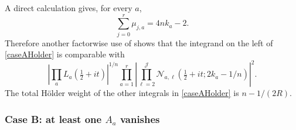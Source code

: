 \documentclass[oneside, 12pt]{amsart}
\theoremstyle{definition}
\begin{document}
{		A direct calculation gives, for every $a$,
		\begin{equation}\label{caseAMuSum}
			\sum_{j=0}^r\mu_{j,a}=4nk_a-2.
		\end{equation}
		Therefore another factorwise use of
		 shows that the integrand on the left
		of \eqref{caseAHolder} is comparable with
		\[
		\left|\prod_aL_a(\tfrac12+it)\right|^{1/n}
		\prod_{a=1}^r\left|
		\prod_{\ell=2}^{\mathscr J}
		\mathcal N_{a,\ell}(\tfrac12+it;2k_a-1/n)
		\right|^2.
		\]
		The total Hölder weight of the other integrals in
		\eqref{caseAHolder} is $n-1/(2R)$.
		
		\subsubsection*{Case B: at least one $A_a$ vanishes}
		
}
\end{document}
